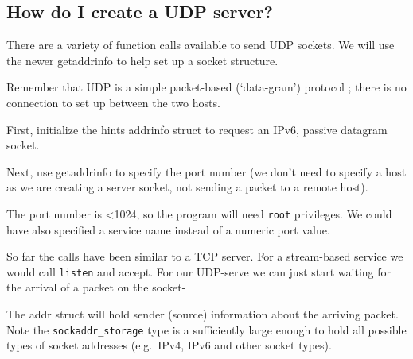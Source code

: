 \subsection{How do I create a UDP
server?}\label{how-do-i-create-a-udp-server}

There are a variety of function calls available to send UDP sockets. We
will use the newer getaddrinfo to help set up a socket structure.

Remember that UDP is a simple packet-based (`data-gram') protocol ;
there is no connection to set up between the two hosts.

First, initialize the hints addrinfo struct to request an IPv6, passive
datagram socket.

\begin{Shaded}
\begin{Highlighting}[]
\NormalTok{, }
\end{Highlighting}
\end{Shaded}

Next, use getaddrinfo to specify the port number (we don't need to
specify a host as we are creating a server socket, not sending a packet
to a remote host).

\begin{Shaded}
\begin{Highlighting}[]

\end{Highlighting}
\end{Shaded}

The port number is \textless{}1024, so the program will need
\texttt{root} privileges. We could have also specified a service name
instead of a numeric port value.

So far the calls have been similar to a TCP server. For a stream-based
service we would call \texttt{listen} and accept. For our UDP-serve we
can just start waiting for the arrival of a packet on the socket-

\begin{Shaded}
\begin{Highlighting}[]
 
 


\end{Highlighting}
\end{Shaded}

The addr struct will hold sender (source) information about the arriving
packet.\\Note the \texttt{sockaddr\_storage} type is a sufficiently
large enough to hold all possible types of socket addresses (e.g.~IPv4,
IPv6 and other socket types).
